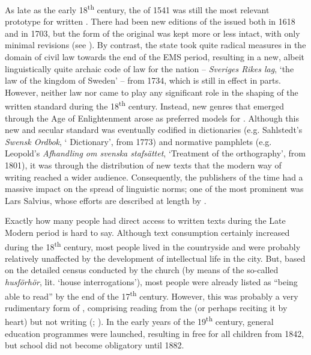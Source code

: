 \documentclass[output=paper]{langscibook}
\begin{document}
As late as the early 18\textsuperscript{th} century, the  of 1541 was still the most relevant prototype for written . There had been new editions of the  issued both in 1618 and in 1703, but the form of the original was kept more or less intact, with only minimal revisions (see \citealt{Platzack2005gamla}). By contrast, the state took quite radical measures in the domain of civil law towards the end of the EMS period, resulting in a new, albeit linguistically quite archaic \citep{Wessen1965} code of law for the nation – \textit{Sveriges Rikes lag}, ‘the law of the kingdom of Sweden’ – from 1734, which is still in effect in parts. However, neither law nor  came to play any significant role in the shaping of the written standard during the 18\textsuperscript{th} century. Instead, new genres that emerged through the Age of Enlightenment arose as preferred models for . Although this new and secular standard was eventually codified in dictionaries (e.g. Sahlstedt’s \textit{Swensk Ordbok}, ‘ Dictionary’, from 1773) and normative pamphlets (e.g. Leopold’s \textit{Afhandling om svenska stafsättet}, ‘Treatment of the  orthography’, from 1801), it was through the distribution of new texts that the modern way of writing  reached a wider audience. Consequently, the  publishers of the time had a massive impact on the spread of linguistic norms; one of the most prominent was Lars Salvius, whose efforts are described at length by \citet{Santesson1986}.



Exactly how many people had direct access to written texts during the Late Modern period is hard to say. Although text consumption certainly increased during the 18\textsuperscript{th} century, most people lived in the countryside and were probably relatively unaffected by the development of intellectual life in the city. But, based on the detailed census conducted by the church (by means of the so-called \textit{husförhör}, lit. ‘house interrogations’), most people were already listed as “being able to read” by the end of the 17\textsuperscript{th} century. However, this was probably a very rudimentary form of , comprising reading from the  (or perhaps reciting it by heart) but not writing (\citealt{Johansson1981}; \citealt{Berg1994}). In the early years of the 19\textsuperscript{th} century, general education programmes were launched, resulting in free  for all children from 1842, but school did not become obligatory until 1882.
\end{document}
